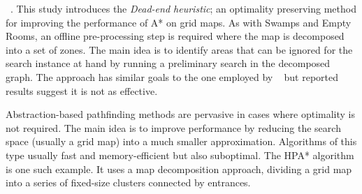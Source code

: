 \citeauthor{bjornsson06}~.  This study introduces the
\emph{Dead-end heuristic}; an optimality preserving
 method for improving the performance of A* on grid maps.
As with Swamps and Empty Rooms, an offline pre-processing step is required where
the map is decomposed into a set of zones.  The main idea is to 
identify areas that can be ignored for the search instance at hand by running a 
preliminary search in the decomposed graph.
The approach has similar goals to the one employed by
\citeauthor{pochter10}~ but reported results suggest it is
not as effective.
\par
Abstraction-based pathfinding methods are pervasive in cases where optimality is
not required.  The main idea is to improve performance by reducing the 
search space (usually a grid map) into a much smaller approximation.  Algorithms
of this type usually fast and memory-efficient but also suboptimal.  The HPA*
algorithm \cite{botea04} is one such example.  It uses a map decomposition
approach, dividing a grid map into a series of fixed-size clusters connected by
entrances.

